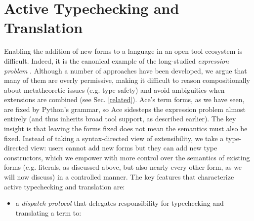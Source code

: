 \documentclass[10pt,preprint]{sigplanconf}
\begin{document}
{\section{Active Typechecking and Translation}\label{att}


Enabling the addition of new forms to a language in an open tool ecosystem is difficult. Indeed, it is the canonical example of the long-studied \emph{expression problem} \cite{wadler1998expression}. Although a number of approaches have been developed, we argue that many of them are overly permissive, making it difficult to reason compositionally about metatheoretic issues (e.g. type safety) and avoid ambiguities when extensions are combined (see Sec. \ref{related}). %
Ace's term forms, as we have seen, are fixed by Python's grammar, so Ace sidesteps the expression problem almost entirely (and thus inherits broad tool support, as described earlier). The key insight is that leaving the forms fixed does not mean the semantics must also be fixed. Instead of taking a syntax-directed view of extensibility, we take a type-directed view: users cannot add new forms but they can add new type constructors, which we empower with  more control over the semantics of existing forms (e.g. literals, as discussed above, but also nearly every other form, as we will now discuss) in a controlled manner.  %
The key features that characterize active typechecking and translation are: \begin{itemize}
\item a \emph{dispatch protocol} that delegates responsibility for typechecking and translating a term to:
  \begin{itemize}

\end{itemize}
\end{itemize}}
\end{document}
